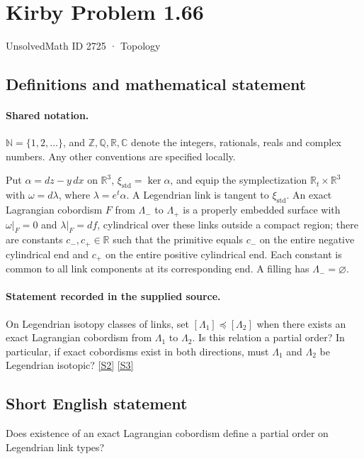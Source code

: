 \documentclass[11pt]{article}
\newcommand{\sref}[2]{\hyperlink{source:#1:#2}{[S#2]}}
\begin{document}
\setcounter{section}{2724}
\section{Kirby Problem 1.66}\label{2725}
{\small\sffamily UnsolvedMath ID 2725 · Topology}
\subsection{Definitions and mathematical statement}

\paragraph{Shared notation.}$\mathbb N=\{1,2,\ldots\}$, and $\mathbb Z,\mathbb Q,\mathbb R,\mathbb C$ denote the integers, rationals, reals and complex numbers. Any other conventions are specified locally.


Put $\alpha=dz-y\,dx$ on $\mathbb R^3$, $\xi_{\mathrm{std}}=\ker\alpha$, and equip the symplectization $\mathbb R_t\times\mathbb R^3$ with $\omega=d\lambda$, where $\lambda=e^t\alpha$. A Legendrian link is tangent to $\xi_{\mathrm{std}}$. An exact Lagrangian cobordism $F$ from $\Lambda_-$ to $\Lambda_+$ is a properly embedded surface with $\omega|_F=0$ and $\lambda|_F=df$, cylindrical over these links outside a compact region; there are constants $c_-,c_+\in\mathbb R$ such that the primitive equals $c_-$ on the entire negative cylindrical end and $c_+$ on the entire positive cylindrical end. Each constant is common to all link components at its corresponding end. A filling has $\Lambda_-=\varnothing$.
\paragraph{Statement recorded in the supplied source.}
On Legendrian isotopy classes of links, set $[\Lambda_1]\preceq[\Lambda_2]$ when there exists an exact Lagrangian cobordism from $\Lambda_1$ to $\Lambda_2$. Is this relation a partial order? In particular, if exact cobordisms exist in both directions, must $\Lambda_1$ and $\Lambda_2$ be Legendrian isotopic? \sref{2725}{2} \sref{2725}{3}

\subsection{Short English statement}
Does existence of an exact Lagrangian cobordism define a partial order on Legendrian link types?
\end{document}

